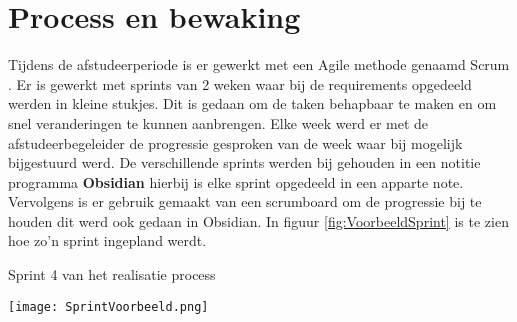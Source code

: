 \section{Process en bewaking}
Tijdens de afstudeerperiode is er gewerkt met een Agile \parencite{Agile} methode genaamd Scrum \Parencite{Scrum}.
Er is gewerkt met sprints van 2 weken waar bij de requirements opgedeeld werden in kleine stukjes.
Dit is gedaan om de taken behapbaar te maken en om snel veranderingen te kunnen aanbrengen.
Elke week werd er met de afstudeerbegeleider de progressie gesproken van de week waar bij mogelijk bijgestuurd werd.
De verschillende sprints werden bij gehouden in een notitie programma \textbf{Obsidian} hierbij is elke sprint opgedeeld in een apparte note.
Vervolgens is er gebruik gemaakt van een scrumboard om de progressie bij te houden dit werd ook gedaan in Obsidian.
In figuur \ref{fig:VoorbeeldSprint} is te zien hoe zo'n sprint ingepland werdt.

\whitespace[2]
\begin{graphic}
	\captionsetup{type=figure}
	\caption{Sprint 4 van het realisatie process}
	\texttt{[image: SprintVoorbeeld.png]}
	\label{fig:VoorbeeldSprint}
\end{graphic}


